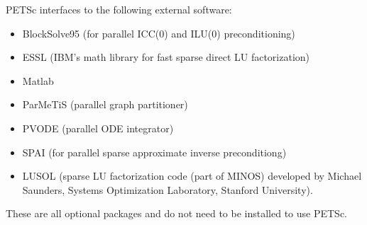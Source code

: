 \vspace{.3in}
\noindent
PETSc interfaces to the following external software:
\begin{itemize}
  \item BlockSolve95 (for parallel ICC(0) and ILU(0) preconditioning)
  \item ESSL         (IBM's math library for fast sparse direct LU factorization)
  \item Matlab       
  \item ParMeTiS      (parallel graph partitioner)
  \item PVODE        (parallel ODE integrator)
  \item SPAI         (for parallel sparse approximate inverse preconditiong)
  \item LUSOL        (sparse LU factorization code (part of MINOS) developed by Michael Saunders,
                      Systems Optimization Laboratory, Stanford University).
\end{itemize}
These are all optional packages and do not need to be installed to use PETSc.


